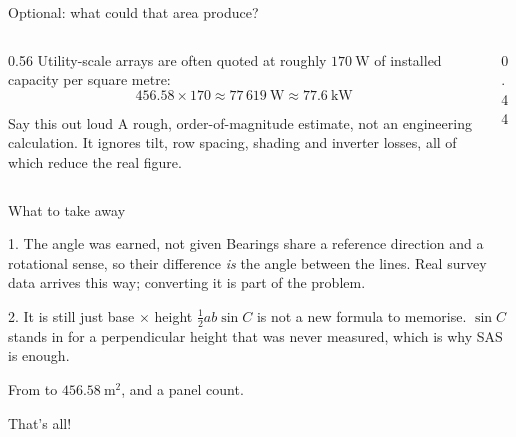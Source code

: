 \documentclass[11pt]{beamer}
\begin{document}
\begin{frame}{Optional: what could that area produce?}
  \begin{columns}[T]
    \begin{column}{0.56\textwidth}
      \small
      Utility-scale arrays are often quoted at roughly $170\ \text{W}$ of
      installed capacity per square metre:
      \begin{equation*}
        456.58 \times 170 \approx 77\,619\ \text{W} \approx 77.6\ \text{kW}
      \end{equation*}

      \begin{alertblock}{Say this out loud}
        \small A rough, order-of-magnitude estimate, not an engineering
        calculation. It ignores tilt, row spacing, shading and inverter
        losses, all of which reduce the real figure.
      \end{alertblock}
    \end{column}
    \begin{column}{0.44\textwidth}
      \centering
      \scalebox{0.72}{\diagPanels}
    \end{column}
  \end{columns}
\end{frame}

\begin{frame}{What to take away}
  \begin{block}{1. The angle was earned, not given}
    Bearings share a reference direction and a rotational sense, so their
    difference \emph{is} the angle between the lines. Real survey data arrives
    this way; converting it is part of the problem.
  \end{block}

  \begin{block}{2. It is still just base $\times$ height}
    $\tfrac12ab\sin C$ is not a new formula to memorise. $\sin C$ stands in
    for a perpendicular height that was never measured, which is why SAS is
    enough.
  \end{block}

  \vfill
  \begin{center}
    From  to
    \alert{$456.58\ \text{m}^2$}, and a panel count.
  \end{center}
\end{frame}

\begin{frame}
  \vfill
  \begin{center}
    \Large That's all!
  \end{center}
  \vfill
\end{frame}
\end{document}

